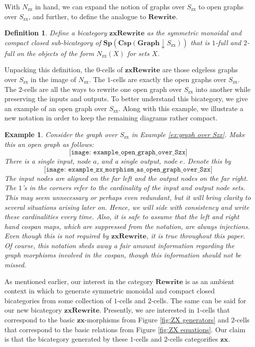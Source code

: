 \documentclass[]{amsart}
\theoremstyle{defn}
\newtheorem{ex}[thm]{Example}
\newtheorem{defn}[thm]{Definition}
\begin{document}
With $N_{\text{zx}}$ in hand, we can expand the notion of graphs over $S_{\text{zx}}$ to open graphs over $S_{\text{zx}}$, and further, to define the analogue to $\mathbf{Rewrite}$. 

\begin{defn}
	Define a bicategory $\mathbf{zxRewrite}$ as the symmetric monoidal and compact closed sub-bicategory of $\mathbf{Sp}(\mathbf{Csp}(\mathbf{Graph} \downarrow S_{\text{zx}}))$ that is $1$-full and $2$-full on the objects of the form $N_{\text{zx}} (X)$ for sets $X$.  
\end{defn}

Unpacking this definition, the $0$-cells of $\mathbf{zxRewrite}$ are those edgeless graphs over $S_{\text{zx}}$ in the image of $N_{\text{zx}}$.  The $1$-cells are exactly the open graphs over $S_{\text{zx}}$. The $2$-cells are all the ways to rewrite one open graph over $S_{\text{zx}}$ into another while preserving the inputs and outputs.  To better understand this bicategory, we give an example of an open graph over $S_{\text{zx}}$. Along with this example, we illustrate a new notation in order to keep the remaining diagrams rather compact.

\begin{ex}
	\label{ex:open graph over Szx}
	Consider the graph over $S_{\text{zx}}$ in Example \ref{ex:graph over Szx}.  Make this an open graph as follows:
	\[
	\texttt{[image: example\_open\_graph\_over\_Szx]}
	\]
	There is a single input, node $a$, and a single output, node $e$. Denote this by
	\[
	\texttt{[image: example\_zx\_morphism\_as\_open\_graph\_over\_Szx]}
	\]
	The input nodes are aligned on the far left and the output nodes on the far right.  The $1$'s in the corners refer to the cardinality of the input and output node sets.  This may seem unnecessary or perhaps even redundant, but it will bring clarity to several situations arising later on. Hence, we will side with consistency and write these cardinalities every time.  Also, it is safe to assume that the left and right hand cospan maps, which are suppressed from the notation, are always injections. Even though this is not required by $\mathbf{zxRewrite}$, it is true throughout this paper.  Of course, this notation sheds away a fair amount information regarding the graph morphisms involved in the cospan, though this information should not be missed.
\end{ex}

As mentioned earlier, our interest in the category $\mathbf{Rewrite}$ is as an ambient context in which to generate symmetric monoidal and compact closed bicategories from some collection of $1$-cells and $2$-cells. The same can be said for our new bicategory $\mathbf{zxRewrite}$.  Presently, we are interested in $1$-cells that correspond to the basic $\mathbf{zx}$-morphisms from Figure \ref{fig:ZX generators} and $2$-cells that correspond to the basic relations from Figure \ref{fig:ZX equations}.  Our claim is that the bicategory generated by these $1$-cells and $2$-cells categorifies $\mathbf{zx}$.
\end{document}
